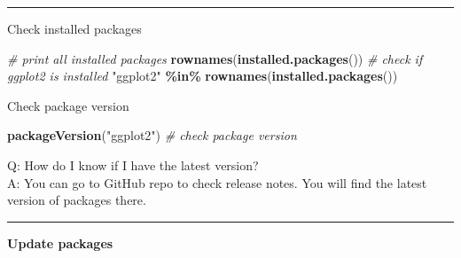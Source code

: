 \documentclass[
]{book}
\newenvironment{Shaded}{\begin{snugshade}}{\end{snugshade}}
\newcommand{\CommentTok}[1]{\textcolor[rgb]{0.56,0.35,0.01}{\textit{#1}}}
\newcommand{\FunctionTok}[1]{\textcolor[rgb]{0.13,0.29,0.53}{\textbf{#1}}}
\newcommand{\NormalTok}[1]{#1}
\newcommand{\SpecialCharTok}[1]{\textcolor[rgb]{0.81,0.36,0.00}{\textbf{#1}}}
\newcommand{\StringTok}[1]{\textcolor[rgb]{0.31,0.60,0.02}{#1}}
\begin{document}
\begin{center}\rule{0.5\linewidth}{0.5pt}\end{center}

Check installed packages

\begin{Shaded}
\begin{Highlighting}[]
\CommentTok{\# print all installed packages}
\FunctionTok{rownames}\NormalTok{(}\FunctionTok{installed.packages}\NormalTok{())}
\CommentTok{\# check if \textasciigrave{}ggplot2\textasciigrave{} is installed}
\StringTok{"ggplot2"} \SpecialCharTok{\%in\%} \FunctionTok{rownames}\NormalTok{(}\FunctionTok{installed.packages}\NormalTok{())}
\end{Highlighting}
\end{Shaded}

Check package version

\begin{Shaded}
\begin{Highlighting}[]
\FunctionTok{packageVersion}\NormalTok{(}\StringTok{"ggplot2"}\NormalTok{) }\CommentTok{\# check package version}
\end{Highlighting}
\end{Shaded}

Q: How do I know if I have the latest version?\\
A: You can go to GitHub repo to check release notes. You will find the latest version of packages there.

\begin{center}\rule{0.5\linewidth}{0.5pt}\end{center}

\textbf{Update packages}
\end{document}
